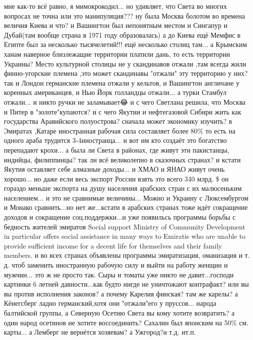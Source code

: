 \begin{itemize}
мне как-то всё равно, я мимокрокодил... но удивляет, что Света во многих вопросах
не точна или это манипуляция??? ну была Москва болотом во времена величия Киева
и что? и Вашингтон был непонятным местом и Сингапур и Дубай(там вообще страна в
1971 году образовалась) а до Киева ещё Мемфис в Египте был за несколько
тысячелетий!!! ещё несколько столиц там...
а Крымским ханам наверное близлежащие территории платили дань, то есть
территории Украины? Место культурной столицы не у скандинавов отжали ,там
всегда жили финно-угорские племена ,это может скандинавы "отжали" эту
территорию у них? так и Лондон германские племена отжали у кельтов, и Вашингтон
англичане у коренных американцев, и Нью Йорк голландцы отжали... а турки Стамбул
отжали... и никто ручки не заламывает\Laughey[1.0][white]😂 и с чего Светлана решила, что Москва и
Питер в "золоте"купаются? и с чего Якутии и нефтегазовой Сибири жить как
государства Аравийского полуострова? сначала может экономику изучить? в
Эмиратах ,Катаре иностранная рабочая сила составляет более 80\% то есть на
одного араба трудится 3-4иностранца... и вот им кто создаёт это богатство
перепадают крохи... а была ли Света в районах, где живут эти
пакистанцы, индийцы, филиппинцы? так ли всё великолепно в сказочных странах? и
кстати Якутия оставляет себе алмазные доходы... и ХМАО и ЯНАО живут очень
хорошо... но даже если весь экспорт России взять это всего 340 млрд. \$ он
гораздо меньше экспорта на душу населения арабских стран с их малюсеньким
населением... и это не сравнимые величины...
Можно и Украину с Люксембургом и Монако сравнить...но нет же...кстати в
арабских странах тоже идёт сокращение доходов и сокращение соц.поддержки...и
уже появильсь программы борьбы с бедность жителей эмиратов Social support
Ministry of Community Development in particular offers social assistance in
many ways to Emiratis who are unable to provide sufficient income for a decent
life for themselves and their family members.
и во всех странах объявлены программы эмиратизация, оманизация и т. д. чтоб
заменить иностранную рабочую силу и выйти на работу женщин и мужчин... это ж не
просто так.
Сыры и томаты уже никто не давит...господи картинки 6 летней давности...как
будто нигде не уничтожают контрафакт? или вы вы против исполнения законов? а
почему Карелия финская? там же карелы? а Кёнегсберг ладно германский,хотя они
"отжали"его у пруссов... народа балтийской группы, а Северную Осетию Света вы
кому хотите возвратить? а один народ осетинов не хотите воссоединить? Сахалин
был японским на 50\% см. карты... а Лемберг не вернётся хозяевам? а
Ужгород?\Laughey[1.0][white]\Laughey[1.0][white]\Laughey[1.0][white]и т.д. ит.п.


\end{itemize}
